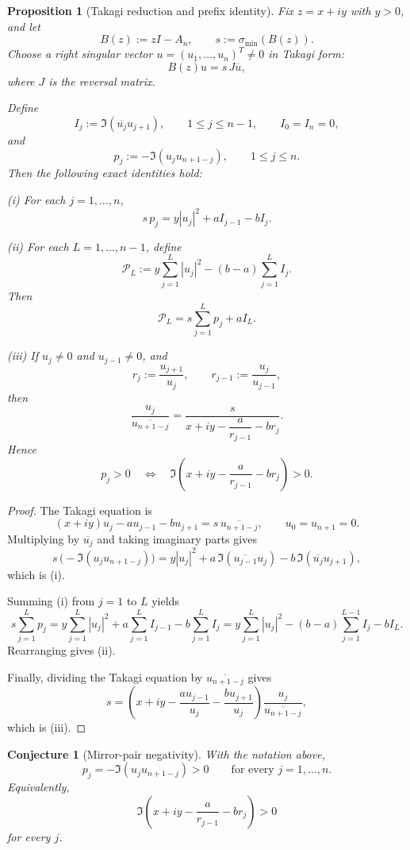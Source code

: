 \documentclass[11pt]{article}
\newtheorem{proposition}[theorem]{Proposition}
\newtheorem{conjecture}[theorem]{Conjecture}
\begin{document}
\begin{proposition}[Takagi reduction and prefix identity]
Fix \(z=x+iy\) with \(y>0\), and let
\[
B(z):=zI-A_n,
\qquad
s:=\sigma_{\min}(B(z)).
\]
Choose a right singular vector \(u=(u_1,\dots,u_n)^T\neq 0\) in Takagi form:
\[
B(z)u=s\,J\overline{u},
\]
where \(J\) is the reversal matrix.

Define
\[
I_j:=\Im(\overline{u_j}u_{j+1}),
\qquad 1\le j\le n-1,
\qquad
I_0=I_n=0,
\]
and
\[
p_j:=-\Im(u_j u_{n+1-j}),
\qquad 1\le j\le n.
\]
Then the following exact identities hold:

\smallskip
\noindent
\textup{(i)} For each \(j=1,\dots,n\),
\[
s\,p_j
=
y|u_j|^2+a I_{j-1}-b I_j.
\]

\smallskip
\noindent
\textup{(ii)} For each \(L=1,\dots,n-1\), define
\[
\mathcal P_L
:=
y\sum_{j=1}^L |u_j|^2-(b-a)\sum_{j=1}^L I_j.
\]
Then
\[
\mathcal P_L
=
s\sum_{j=1}^L p_j + a I_L.
\]

\smallskip
\noindent
\textup{(iii)} If \(u_j\neq 0\) and \(u_{j-1}\neq 0\), and
\[
r_j:=\frac{u_{j+1}}{u_j},
\qquad
r_{j-1}:=\frac{u_j}{u_{j-1}},
\]
then
\[
\frac{u_j}{\overline{u_{n+1-j}}}
=
\frac{s}{x+iy-\dfrac{a}{r_{j-1}}-b r_j}.
\]
Hence
\[
p_j>0
\quad\Longleftrightarrow\quad
\Im\!\left(x+iy-\frac{a}{r_{j-1}}-b r_j\right)>0.
\]
\end{proposition}

\begin{proof}
The Takagi equation is
\[
(x+iy)u_j-a u_{j-1}-b u_{j+1}=s\,\overline{u_{n+1-j}},
\qquad
u_0=u_{n+1}=0.
\]
Multiplying by \(\overline{u_j}\) and taking imaginary parts gives
\[
s\,\bigl(-\Im(u_j u_{n+1-j})\bigr)
=
y|u_j|^2+a\,\Im(\overline{u_{j-1}}u_j)-b\,\Im(\overline{u_j}u_{j+1}),
\]
which is \textup{(i)}.

Summing \textup{(i)} from \(j=1\) to \(L\) yields
\[
s\sum_{j=1}^L p_j
=
y\sum_{j=1}^L|u_j|^2
+a\sum_{j=1}^L I_{j-1}
-b\sum_{j=1}^L I_j
=
y\sum_{j=1}^L|u_j|^2
-(b-a)\sum_{j=1}^{L-1}I_j
-b I_L.
\]
Rearranging gives \textup{(ii)}.

Finally, dividing the Takagi equation by \(\overline{u_{n+1-j}}\) gives
\[
s
=
\left(x+iy-\frac{a u_{j-1}}{u_j}-\frac{b u_{j+1}}{u_j}\right)\frac{u_j}{\overline{u_{n+1-j}}},
\]
which is \textup{(iii)}.
\end{proof}

\begin{conjecture}[Mirror-pair negativity]
With the notation above,
\[
p_j=-\Im(u_j u_{n+1-j})>0
\qquad\text{for every }j=1,\dots,n.
\]
Equivalently,
\[
\Im\!\left(x+iy-\frac{a}{r_{j-1}}-b r_j\right)>0
\]
for every \(j\).
\end{conjecture}
\end{document}
